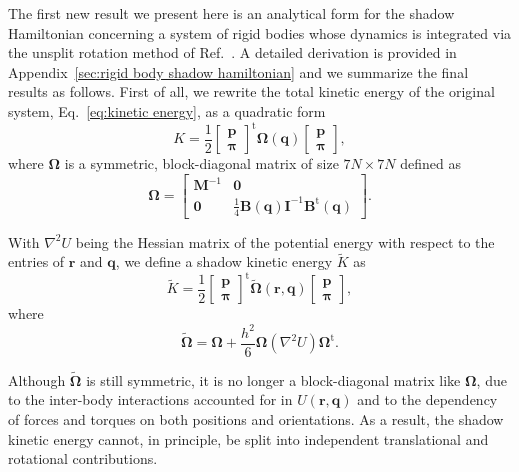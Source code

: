 \documentclass[journal=jctcce,manuscript=article,layout=twocolumn]{achemso}
\newcommand{\mt}[1]{\boldsymbol{\mathbf{#1}}}   %
\newcommand{\vt}[1]{\boldsymbol{\mathbf{#1}}}   %
\newcommand{\tr}[1]{#1^\text{t}}                %
\newcommand{\timestep}{h}
\newcommand{\modified}[1]{\widetilde{#1}}
\begin{document}
The first new result we present here is an analytical form for the shadow Hamiltonian concerning a system of rigid bodies whose dynamics is integrated via the unsplit rotation method of Ref.~. A detailed derivation is provided in Appendix~\ref{sec:rigid body shadow hamiltonian} and we summarize the final results as follows. First of all, we rewrite the total kinetic energy of the original system, Eq.~\eqref{eq:kinetic energy}, as a quadratic form
\begin{equation*}
K = \frac{1}{2} \tr{ \left[\begin{array}{c} \vt p \\ \vt \pi \end{array}\right]} {\mt \Omega}(\vt q) \left[\begin{array}{c} \vt p \\ \vt \pi \end{array}\right],
\end{equation*}
where $\mt \Omega$ is a symmetric, block-diagonal matrix of size $7N \times 7N$ defined as
\begin{equation*}
{\mt \Omega} = \left[\begin{array}{cc}
{\mt M}^{-1} & \mt 0 \\
\mt 0 & \frac{1}{4} {\mt B}(\vt q) {\mt I}^{-1} \tr{\mt B}(\vt q)
\end{array}\right].
\end{equation*}

With $\nabla^2 U$ being the Hessian matrix of the potential energy with respect to the entries of $\vt r$ and $\vt q$, we define a shadow kinetic energy $\modified K$ as
\begin{equation*}
\modified K = \frac{1}{2} \tr{ \left[\begin{array}{c} \vt p \\ \vt \pi \end{array}\right]} \modified{\mathbf \Omega}(\vt r, \vt q) \left[\begin{array}{c} \vt p \\ \vt \pi \end{array}\right],
\end{equation*}
where
\begin{equation*}
\modified{\mathbf \Omega} = {\mt \Omega} + \frac{\timestep^2}{6} {\mt \Omega} (\nabla^2 U) \tr{\mt \Omega}.
\end{equation*}

Although $\modified{\mathbf \Omega}$ is still symmetric, it is no longer a block-diagonal matrix like $\mt \Omega$, due to the inter-body interactions accounted for in $U(\vt r, \vt q)$ and to the dependency of forces and torques on both positions and orientations. As a result, the shadow kinetic energy cannot, in principle, be split into independent translational and rotational contributions.
\end{document}
